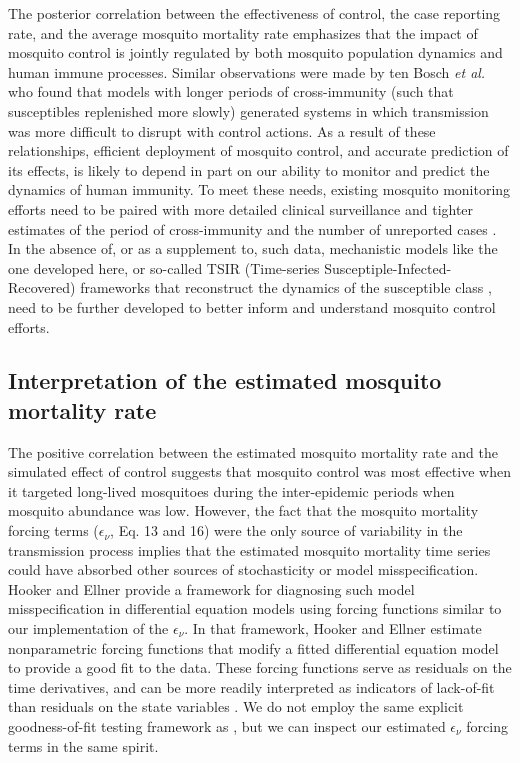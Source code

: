 \documentclass[10pt,letterpaper]{article}
\begin{document}
The posterior correlation between the effectiveness of control, the case reporting rate, and the average mosquito mortality rate emphasizes that the impact of mosquito control is jointly regulated by both mosquito population dynamics and human immune processes.
Similar observations were made by ten Bosch \emph{et al.} \cite{TenBosch2016} who found that models with longer periods of cross-immunity (such that susceptibles replenished more slowly) generated systems in which transmission was more difficult to disrupt with control actions.
As a result of these relationships, efficient deployment of mosquito control, and accurate prediction of its effects, is likely to depend in part on our ability to monitor and predict the dynamics of human immunity.
To meet these needs, existing mosquito monitoring efforts need to be paired with more detailed clinical surveillance \cite{Morrison2008} and tighter estimates of the period of cross-immunity \cite{TenBosch2016} and the number of unreported cases \cite{Silva2016}.
In the absence of, or as a supplement to, such data, mechanistic models like the one developed here, or so-called TSIR (Time-series Susceptiple-Infected-Recovered) frameworks that reconstruct the dynamics of the susceptible class \cite{Finkenstadt2000, Reich2013}, need to be further developed to better inform and understand mosquito control efforts.

\subsection*{Interpretation of the estimated mosquito mortality rate}

The positive correlation between the estimated mosquito mortality rate and the simulated effect of control suggests that mosquito control was most effective when it targeted long-lived mosquitoes during the inter-epidemic periods when mosquito abundance was low.  
However, the fact that the mosquito mortality forcing terms ($\epsilon_{\nu}$, Eq. 13 and 16) were the only source of variability in the transmission process implies that the estimated mosquito mortality time series could have absorbed other sources of stochasticity or model misspecification.
Hooker and Ellner \cite{Hooker2015} provide a framework for diagnosing such model misspecification in differential equation models using forcing functions similar to our implementation of the $\epsilon_{\nu}$.
In that framework, Hooker and Ellner \cite{Hooker2015} estimate nonparametric forcing functions that modify a fitted differential equation model to provide a good fit to the data.
These forcing functions serve as residuals on the time derivatives, and can be more readily interpreted as indicators of lack-of-fit than residuals on the state variables \cite{Hotelling1927, Hooker2015}.
We do not employ the same explicit goodness-of-fit testing framework as \cite{Hooker2015}, but we can inspect our estimated $\epsilon_{\nu}$ forcing terms in the same spirit.
\end{document}
